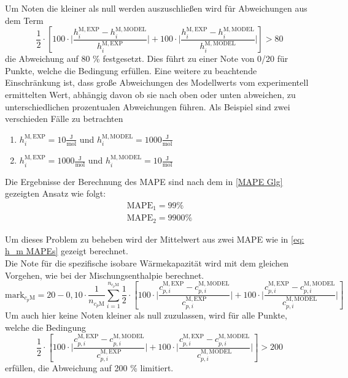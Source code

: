 \documentclass[../thesis.tex]{subfiles}
\begin{document}
Um Noten die kleiner als null werden auszuschließen wird für Abweichungen aus dem Term
\begin{equation}
	\label{eq: h_m MAPEs}
	\dfrac{1}{2} \cdot \left[
	100 \cdot \biggl|
	\dfrac{h_i^{\mathrm{M,EXP}}-h_i^{\mathrm{M,MODEL}}}{h_i^{\mathrm{M,EXP}}} 
	\biggl| 
	+ 100 \cdot \biggl| \dfrac{h_i^{\mathrm{M,EXP}}-h_i^{\mathrm{M,MODEL}}}{h_i^{\mathrm{M,MODEL}}}
	\biggl| \right] > 80
\end{equation}
die Abweichung auf 80 \% festgesetzt. Dies führt zu einer Note von 0/20 für Punkte, welche die Bedingung erfüllen. Eine weitere zu beachtende Einschränkung ist, dass große Abweichungen des Modellwerts vom experimentell ermittelten Wert, abhängig davon ob sie nach oben oder unten abweichen, zu unterschiedlichen prozentualen Abweichungen führen.
Als Beispiel sind zwei verschieden Fälle zu betrachten
\begin{enumerate}
	\item $ h_i^{\mathrm{M,EXP}} = 10 \mathrm{\frac{J}{mol}} $ und $ h_i^{\mathrm{M,MODEL}} = 1000 \mathrm{\frac{J}{mol}} $
	\item $ h_i^{\mathrm{M,EXP}} = 1000 \mathrm{\frac{J}{mol}} $ und $ h_i^{\mathrm{M,MODEL}} = 10 \mathrm{\frac{J}{mol}} $
\end{enumerate}
Die Ergebnisse der Berechnung des MAPE sind nach dem in \autoref{MAPE Glg} gezeigten Ansatz wie folgt:
\begin{eqnarray}
\mathrm{MAPE}_1 = 99\% \\
\mathrm{MAPE}_2 = 9900 \%
\end{eqnarray}

Um dieses Problem zu beheben wird der Mittelwert aus zwei MAPE wie in \autoref{eq: h_m MAPEs} gezeigt berechnet.
\\

Die Note für die spezifische isobare Wärmekapazität wird mit dem gleichen Vorgehen, wie bei der Mischungsenthalpie berechnet.
\begin{equation}
\mathrm{mark}_{c_p{\mathrm{M}}} = 20 - 0,10 \cdot \dfrac{1}{n_{c_p{\mathrm{M}}}} \sum_{i=1}^{n_{c_p{\mathrm{M}}}}
\dfrac{1}{2} \cdot \left[
100 \cdot \biggl|
\dfrac{c_{p,i}^{\mathrm{M,EXP}}-c_{p,i}^{\mathrm{M,MODEL}}}{c_{p,i}^{\mathrm{M,EXP}}} 
\biggl| 
+ 100 \cdot \biggl| \dfrac{c_{p,i}^{\mathrm{M,EXP}}-c_{p,i}^{\mathrm{M,MODEL}}}{c_{p,i}^{\mathrm{M,MODEL}}}
\biggl|
\right]
\label{eq: cp MAPEs}
\end{equation}
Um auch hier keine Noten kleiner als null zuzulassen, wird für alle Punkte, welche die Bedingung 
\begin{equation}
\dfrac{1}{2} \cdot \left[
100 \cdot \biggl|
\dfrac{c_{p,i}^{\mathrm{M,EXP}}-c_{p,i}^{\mathrm{M,MODEL}}}{c_{p,i}^{\mathrm{M,EXP}}} 
\biggl| 
+ 100 \cdot \biggl| \dfrac{c_{p,i}^{\mathrm{M,EXP}}-c_{p,i}^{\mathrm{M,MODEL}}}{c_{p,i}^{\mathrm{M,MODEL}}}
\biggl| \right]> 200
\end{equation}
erfüllen, die Abweichung auf 200 \% limitiert.
\end{document}
